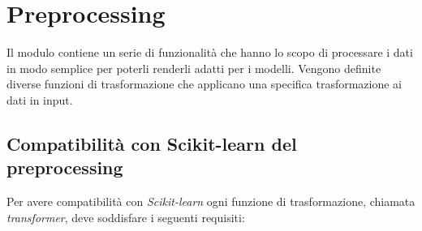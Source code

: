 \section{Preprocessing}
Il modulo contiene un serie di funzionalità che hanno lo scopo di processare i dati in modo semplice per poterli renderli adatti per i modelli. Vengono definite diverse funzioni di trasformazione che applicano una specifica trasformazione ai dati in input.

\subsection{Compatibilità con Scikit-learn del preprocessing}

Per avere compatibilità con \textit{Scikit-learn} ogni funzione di trasformazione, chiamata \textit{transformer}, deve soddisfare i seguenti requisiti:

